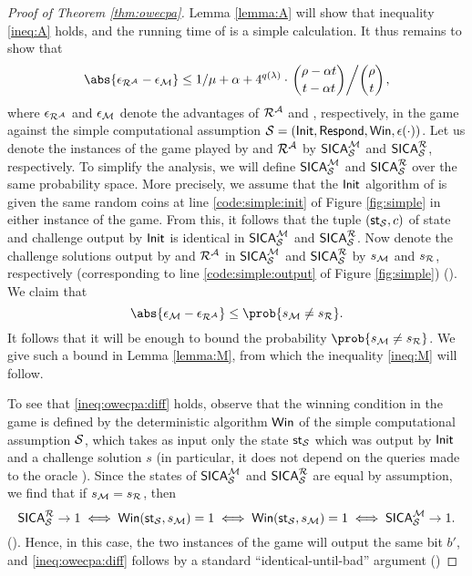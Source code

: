 \begin{proof}[Proof of Theorem \ref{thm:owecpa}]
  Lemma \ref{lemma:A} will show that inequality \eqref{ineq:A} holds,
  and the running time of \redM is a simple calculation.
  It thus remains to show that
  \[
    \abs{\epsilon_{\redR^{\advA}} - \epsilon_{\redM}} \le 1/\mu + \alpha
    + 4^{q(\lambda)} \cdot \left. \binom{\rho - \alpha t}{t - \alpha t} \middle/ \binom{\rho}{t} \right.,
  \]
  where \(\epsilon_{\redR^{\advA}}\) and \(\epsilon_{\mathcal{M}}\) denote
  the advantages of \(\redR^{\advA}\) and \redM, respectively, in the game \SICA
  against the simple computational assumption \(\mathcal{S} = (\mathsf{Init}, \mathsf{Respond}, \mathsf{Win}, \epsilon(\cdot))\).
  Let us denote the instances of the \SICA game played by \redM and \(\redR^{\advA}\)
  by \(\mathsf{SICA}_{\mathcal{S}}^{\mathcal{M}}\) and \(\SICA_{\Simple}^{\redR}\), respectively.
  To simplify the analysis, we will define \(\mathsf{SICA}_{\mathcal{S}}^{\mathcal{M}}\)
  and \(\SICA_{\Simple}^{\redR}\) over the same probability space.
  More precisely, we assume that the \(\mathsf{Init}\) algorithm of \Simple
  is given the same random coins at line \ref{code:simple:init} of Figure \ref{fig:simple}
  in either instance of the \SICA game.
  From this, it follows that the tuple \((\mathsf{st}_{\mathcal{S}},c)\) of state and challenge
  output by \(\mathsf{Init}\) is identical in \(\mathsf{SICA}_{\mathcal{S}}^{\mathcal{M}}\) and \(\SICA_{\Simple}^{\redR}\).
  Now denote the challenge solutions output by \redM and \(\redR^{\advA}\)
  in \(\mathsf{SICA}_{\mathcal{S}}^{\mathcal{M}}\) and \(\SICA_{\Simple}^{\redR}\)
  by \(s_{\mathcal{M}}\) and \(s_{\redR}\), respectively (corresponding to line \ref{code:simple:output} of Figure \ref{fig:simple})
  ().
  We claim that
  \begin{equation}\label{ineq:owecpa:diff}
    \abs{\epsilon_{\redM} - \epsilon_{\redR^{\advA}}} \le \prob{s_{\redM} \ne s_{\redR}}.
  \end{equation}
  It follows that it will be enough to bound the probability \(\prob{s_{\redM} \ne s_{\redR}}\).
  We give such a bound in Lemma \ref{lemma:M}, from which the inequality \eqref{ineq:M} will follow.

  To see that \eqref{ineq:owecpa:diff} holds,
  observe that the winning condition in the game \SICA
  is defined by the deterministic algorithm \(\mathsf{Win}\)
  of the simple computational assumption \(\mathcal{S}\),
  which takes as input only the state \(\mathsf{st}_{\mathcal{S}}\) which was output by \(\mathsf{Init}\)
  and a challenge solution \(s\)
  (in particular, it does not depend on the queries made to the oracle \oracle).
  Since the states of \(\mathsf{SICA}_{\mathcal{S}}^{\mathcal{M}}\) and \(\SICA_{\Simple}^{\redR}\)
  are equal by assumption, we find that if \(s_{\redM} = s_{\redR}\), then
  \[
  \SICA_{\Simple}^{\redR} \to 1 \iff \Win(\state_{\Simple},s_{\redM}) = 1 \iff \Win(\state_{\Simple},s_{\redM}) = 1 \iff \SICA_{\Simple}^{\redM} \to 1.
  \]
  ().
  Hence, in this case, the two instances of the \SICA game will output the same bit \(b'\),
  and \eqref{ineq:owecpa:diff} follows by a standard ``identical-until-bad'' argument
  ()
\end{proof}

